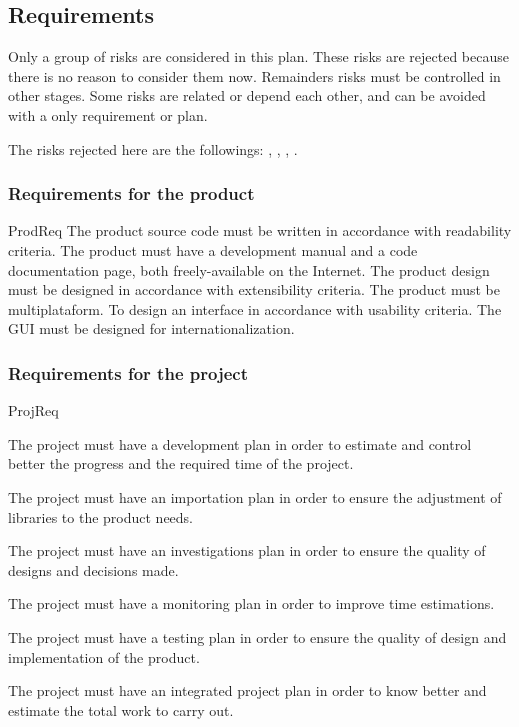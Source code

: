 \documentclass[twocolumn]{article}
\begin{document}
\subsection{Requirements}
Only a group of risks are considered in this plan. These risks are
rejected because there is no reason to consider them now. Remainders
risks must be controlled in other stages. Some risks are related or
depend each other, and can be avoided with a only requirement or
plan.

The risks rejected here are the followings: ,
, , .

\subsubsection{Requirements for the product}
\label{sssec:prodreq}

\begin{labeledpars}{ProdReq}
   The product source code must be
  written in accordance with readability criteria. The product must
  have a development manual and a code documentation page, both
  freely-available on the Internet.
   The product design must be designed in
  accordance with extensibility criteria. The product must be
  multiplataform.
   To design an interface in accordance with usability
  criteria. The GUI must be designed for internationalization.
\end{labeledpars}

\subsubsection{Requirements for the project}
\begin{labeledpars}{ProjReq}

   The project must have a development
  plan in order to estimate and control better the progress and the
  required time of the project.

   The project must have an importation
  plan in order to ensure the adjustment of libraries to the product
  needs.

   The project must have an
  investigations plan in order to ensure the quality of designs and
  decisions made.

   The project must have a monitoring plan
  in order to improve time estimations.

   The project must have a testing plan
  in order to ensure the quality of design and implementation of the
  product.

   The project must have an integrated
  project plan in order to know better and estimate the total work to
  carry out.
\end{labeledpars}
\end{document}

